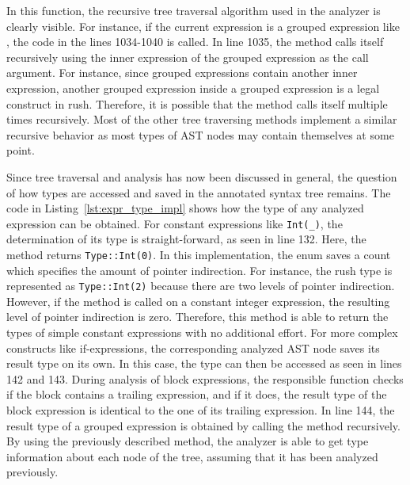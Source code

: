In this function, the recursive tree traversal algorithm used in the analyzer is clearly visible.
For instance, if the current expression is a grouped expression like , the code in the lines 1034-1040 is called.
In line 1035, the  method calls itself recursively using the inner expression of the grouped expression as the call argument.
For instance, since grouped expressions contain another inner expression, another grouped expression inside a grouped expression is a legal construct in rush.
Therefore, it is possible that the  method calls itself multiple times recursively.
Most of the other tree traversing methods implement a similar recursive behavior as most types of AST nodes may contain themselves at some point.


Since tree traversal and analysis has now been discussed in general, the question of how types are accessed and saved in the annotated syntax tree remains.
The code in Listing~\ref{lst:expr_type_impl} shows how the type of any analyzed expression can be obtained.
For constant expressions like \verb|Int(_)|, the determination of its type is straight-forward, as seen in line 132.
Here, the  method returns \verb|Type::Int(0)|.
In this implementation, the  enum saves a count which specifies the amount of pointer indirection.
For instance, the rush type  is represented as \verb|Type::Int(2)| because there are two levels of pointer indirection.
However, if the method is called on a constant integer expression, the resulting level of pointer indirection is zero.
Therefore, this method is able to return the types of simple constant expressions with no additional effort.
For more complex constructs like if-expressions, the corresponding analyzed AST node saves its result type on its own.
In this case, the type can then be accessed as seen in lines 142 and 143.
During analysis of block expressions, the responsible function checks if the block contains a trailing expression,
and if it does, the result type of the block expression is identical to the one of its trailing expression.
In line 144, the result type of a grouped expression is obtained by calling the  method recursively.
By using the previously described method, the analyzer is able to get type information about each node of the tree, assuming that it has been analyzed previously.


